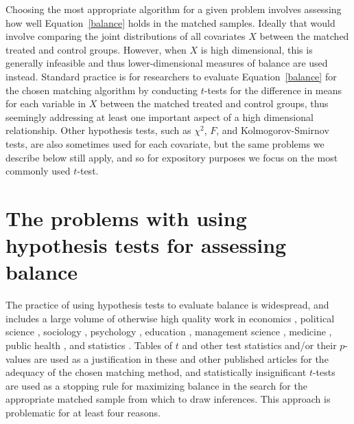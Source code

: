 \documentclass[11pt,titlepage]{article}
\begin{document}
Choosing the most appropriate algorithm for a given problem involves
assessing how well Equation~\ref{balance} holds in the matched
samples.  Ideally that would involve comparing the joint distributions
of all covariates $X$ between the matched treated and control
groups.  However, when $X$ is high dimensional, this is generally
infeasible and thus lower-dimensional measures of balance are used
instead.  Standard practice is for researchers to evaluate
Equation~\ref{balance} for the chosen matching algorithm by
conducting $t$-tests for the difference in means for each variable in
$X$ between the matched treated and control groups, thus seemingly
addressing at least one important aspect of a high dimensional
relationship.  Other hypothesis tests, such as $\chi^2$, $F$, and
Kolmogorov-Smirnov tests, are also sometimes used for each covariate,
but the same problems we describe below still apply, and so for
expository purposes we focus on the most commonly used $t$-test.
\\


\section{The problems with using hypothesis tests for assessing balance}
The practice of using hypothesis tests to evaluate balance is
widespread, and includes a large volume of otherwise high quality work
in economics \citep{LisMilFre03,BlaSmi04,AgoDyn04,DehWah99,
  DehWah02,SmiTod05}, political science \citep{Imai05,SimHop05},
sociology \citep{LunSmi05}, psychology
\citep{HavNag05,HilWalBro05,YosMagBos03,JonDAgGon04,McCRidMor04},
education \citep{Crosnoe05,SchBuc03}, management science
\citep{FreMil04, Villalonga04,WanSchAvo05}, medicine
\citep{WanSchAvo05, MacRivJur06,LinPekWan05,ManTudDie06, PetRoeMul06,
  ShiLitPot06,SabCanGib05,PerTuUnd00,AusMam06,AusMamStu05}, public
health \citep{NovReaRau06,ElBGilWu05,LauSmiSta00,BinBreEar05}, and
statistics \citep{LuZanHor01}.  Tables of $t$ and other test
statistics and/or their $p$-values are used as a justification in
these and other published articles for the adequacy of the chosen
matching method, and statistically insignificant $t$-tests are used as
a stopping rule for maximizing balance in the search for the
appropriate matched sample from which to draw inferences.  This
approach is problematic for at least four reasons.
\end{document}
